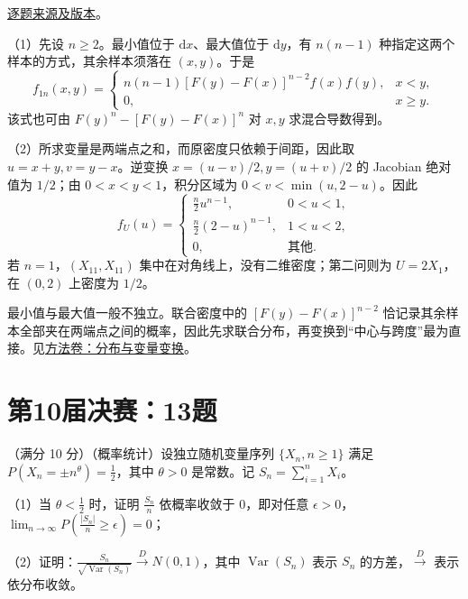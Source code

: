 \documentclass[UTF8,12pt,a4paper,fontset=fandol]{ctexbook}
\begin{document}
\href{https://github.com/lzxcr/cmc-mathematics/blob/64916fa1fdbc3e444a652eca204d5669058ee321/src/problems/finals/09/15.md}{逐题来源及版本}。

\begin{solve}

（1）先设 $n\geq2$。最小值位于 $\mathrm dx$、最大值位于 $\mathrm dy$，有 $n(n-1)$ 种指定这两个样本的方式，其余样本须落在 $(x,y)$。于是
\[
f_{1n}(x,y)=\begin{cases}n(n-1)[F(y)-F(x)]^{n-2}f(x)f(y),&x<y,\\0,&x\geq y.\end{cases}
\]
该式也可由 $F(y)^n-[F(y)-F(x)]^n$ 对 $x,y$ 求混合导数得到。

（2）所求变量是两端点之和，而原密度只依赖于间距，因此取 $u=x+y,v=y-x$。逆变换 $x=(u-v)/2,y=(u+v)/2$ 的 Jacobian 绝对值为 $1/2$；由 $0<x<y<1$，积分区域为 $0<v<\min(u,2-u)$。因此
\[
f_U(u)=\begin{cases}\frac n2u^{n-1},&0<u<1,\\\frac n2(2-u)^{n-1},&1<u<2,\\0,&\text{其他}.\end{cases}
\]
若 $n=1$，$(X_{11},X_{11})$ 集中在对角线上，没有二维密度；第二问则为 $U=2X_1$，在 $(0,2)$ 上密度为 $1/2$。

\end{solve}

\begin{remark}[方法与条件]

最小值与最大值一般不独立。联合密度中的 $[F(y)-F(x)]^{n-2}$ 恰记录其余样本全部夹在两端点之间的概率，因此先求联合分布，再变换到“中心与跨度”最为直接。见\hyperref[app:probability-law]{方法卷：分布与变量变换}。

\end{remark}

\section{第10届决赛：13题}\label{pr:fin10-hi:13}

\begin{example}[公开题解转录]\label{q:fin10-hi:13}

（满分 10 分）（概率统计）设独立随机变量序列 $\{X_n,n\geq1\}$ 满足 $P(X_n=\pm n^{\theta})=\frac{1}{2}$，其中 $\theta>0$ 是常数。记 $S_n=\sum_{i=1}^{n}X_i$。

（1）当 $\theta<\frac{1}{2}$ 时，证明 $\frac{S_n}{n}$ 依概率收敛于 $0$，即对任意 $\epsilon>0$，$\lim_{n\to\infty}P\left(\frac{\left|S_n\right|}{n}\geq\epsilon\right)=0$；

（2）证明：$\frac{S_n}{\sqrt{\operatorname{Var}\left(S_n\right)}}\xrightarrow{D}N(0,1)$，其中 $\operatorname{Var}\left(S_n\right)$ 表示 $S_n$ 的方差，$\xrightarrow{D}$ 表示依分布收敛。

\end{example}
\end{document}
